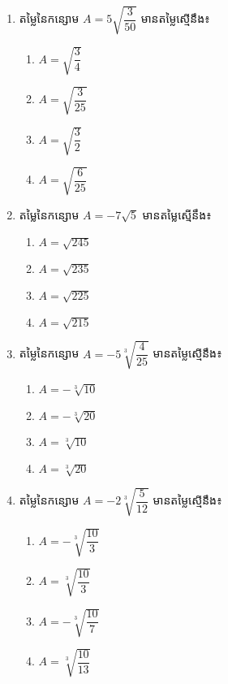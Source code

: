 \begin{enumerate}
\item តម្លៃនៃកន្សោម $A=5\sqrt{\dfrac{3}{50}}$ មានតម្លៃស្មើនឹង៖
\begin{multicols}{4}
\begin{enumerate}[label=\alph*.]
	\item $A=\sqrt{\dfrac{3}{4}}$
	\item $A=\sqrt{\dfrac{3}{25}}$
	\item $A=\sqrt{\dfrac{3}{2}}$
	\item $A=\sqrt{\dfrac{6}{25}}$
\end{enumerate}
\end{multicols}

\item តម្លៃនៃកន្សោម $A=-7\sqrt{5}$ មានតម្លៃស្មើនឹង៖
\begin{multicols}{4}
\begin{enumerate}[label=\alph*.]
	\item $A=\sqrt{245}$
	\item $A=\sqrt{235}$
	\item $A=\sqrt{225}$
	\item $A=\sqrt{215}$
\end{enumerate}
\end{multicols}

\item តម្លៃនៃកន្សោម $A=-5\sqrt[3]{\dfrac{4}{25}}$ មានតម្លៃស្មើនឹង៖
\begin{multicols}{4}
\begin{enumerate}[label=\alph*.]
	\item $A=-\sqrt[3]{10}$
	\item $A=-\sqrt[3]{20}$
	\item $A=\sqrt[3]{10}$
	\item $A=\sqrt[3]{20}$
\end{enumerate}
\end{multicols}

\item តម្លៃនៃកន្សោម $A=-2\sqrt[3]{\dfrac{5}{12}}$ មានតម្លៃស្មើនឹង៖
\begin{multicols}{4}
\begin{enumerate}[label=\alph*.]
	\item $A=-\sqrt[3]{\dfrac{10}{3}}$
	\item $A=\sqrt[3]{\dfrac{10}{3}}$
	\item $A=-\sqrt[3]{\dfrac{10}{7}}$
	\item $A=\sqrt[3]{\dfrac{10}{13}}$
\end{enumerate}
\end{multicols}


\end{enumerate}
